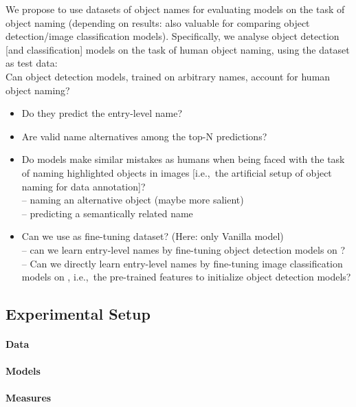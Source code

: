 We propose to use datasets of object names for evaluating models on the task of object naming (depending on results: also valuable for comparing object detection/image classification models).
Specifically, we analyse object detection [and classification] models on the task of human object naming, using the \mn dataset as test data:\\
Can object detection models, trained on arbitrary names, account for human object naming?
\begin{itemize}
	\item Do they predict the entry-level name?
	\item Are valid name alternatives among the top-N predictions?
	\item Do models make similar mistakes as humans when being faced with the task of naming highlighted objects in images [i.e.,\ the artificial setup of object naming for data annotation]?\\
	-- naming an alternative object (maybe more salient)\\
	-- predicting a semantically related name
	\item Can we use \mn as fine-tuning dataset? (Here: only Vanilla model)\\
	-- can we learn entry-level names by fine-tuning object detection models on \mn?\\
	-- Can we directly learn entry-level names by fine-tuning image classification models on \mn, i.e.,\ the pre-trained features to initialize object detection models?
\end{itemize}

\subsection{Experimental Setup}
\label{sect:exp_setup}

\paragraph{Data}

\paragraph{Models}

\paragraph{Measures}


